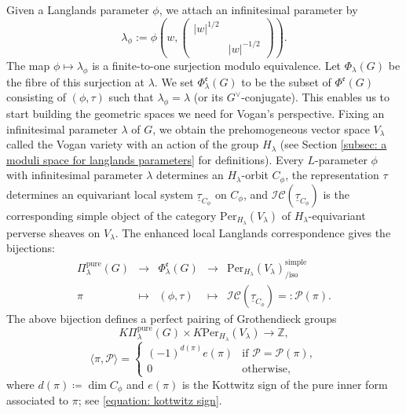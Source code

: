 \documentclass[11pt,letterpaper]{amsart}
\newcommand{\dualgroup}[1]{{#1}^\vee}
\newcommand{\pure}{\mathrm{pure}}
\newcommand{\mfr}[1]{\mathfrak{#1}}
\newcommand{\Per}{\mathrm{Per}}
\newcommand{\locsys}[2]{\underline{#1}_{#2}}
\renewcommand{\1}{\mathbbm{1}}
\numberwithin{equation}{section}
\begin{document}
Given a Langlands parameter $\phi$, we attach an infinitesimal parameter by
\[ \lambda_{\phi}:= \phi\left(w,\begin{pmatrix}
    |w|^{1/2}&\\&|w|^{-1/2}
\end{pmatrix}\right).\]
The map $\phi \mapsto\lambda_{\phi}$ is a finite-to-one surjection modulo equivalence.  Let $\Phi_{\lambda}(G)$ be the fibre of this surjection at $\lambda$. We set $\Phi^{\mathfrak{e}}_\lambda(G)$ to be the subset of $\Phi^{\mfr{e}}(G)$ consisting of $(\phi,\tau)$ such that $\lambda_\phi=\lambda$ (or its $\dualgroup{G}$-conjugate). This enables us to start building the geometric spaces we need for Vogan's perspective.
Fixing an infinitesimal parameter $\lambda$ of $G$, we obtain the prehomogeneous vector space $V_\lambda$ called the {Vogan variety} with an action of the group $H_\lambda$ (see Section \ref{subsec: a moduli space for langlands parameters} for definitions).  Every $L$-parameter $\phi$ with infinitesimal parameter $\lambda$ determines an $H_\lambda$-orbit $C_\phi$, the representation $\tau$ determines an equivariant local system $\locsys{\tau}{C_\phi}$ on $C_\phi$, and $\mathcal{IC}(\locsys{\tau}{C_\phi})$ is the corresponding simple object of the category $\Per_{H_\lambda}(V_\lambda)$ of $H_\lambda$-equivariant perverse sheaves on $V_\lambda$. The enhanced local Langlands correspondence gives the bijections:
  \[\begin{array}{ccccc}
\Pi_\lambda^\pure(G) &{\longrightarrow} &\Phi^{\mathfrak{e}}_\lambda(G) & {\longrightarrow} &  \Per_{H_\lambda}(V_\lambda)^{\mathrm{simple}}_{\mathrm{/iso}} \\
\pi & {\longmapsto} & (\phi, \tau) & {\longmapsto} & \mathcal{IC}(\locsys{\tau}{C_\phi})=: \mathcal{P}(\pi).
\end{array}
\]
The above bijection defines a perfect pairing of Grothendieck groups
\[
    K\Pi^\pure_\lambda(G) \times K\Per_{H_\lambda}(V_\lambda) \to \mathbb{Z},
\]
\begin{equation}\label{equation: pairing in the introduction}
\langle \pi,\mathcal{P}\rangle =
\begin{cases}
    (-1)^{d(\pi)}e(\pi) & \text{if } \mathcal{P} = \mathcal{P}(\pi),\\
    0 & \text{otherwise},
\end{cases}
\end{equation}
where $d(\pi) \coloneqq \dim C_{\phi}$ and $e(\pi)$ is the Kottwitz sign of the pure inner form associated to $\pi$; see \eqref{equation: kottwitz sign}.
\end{document}
